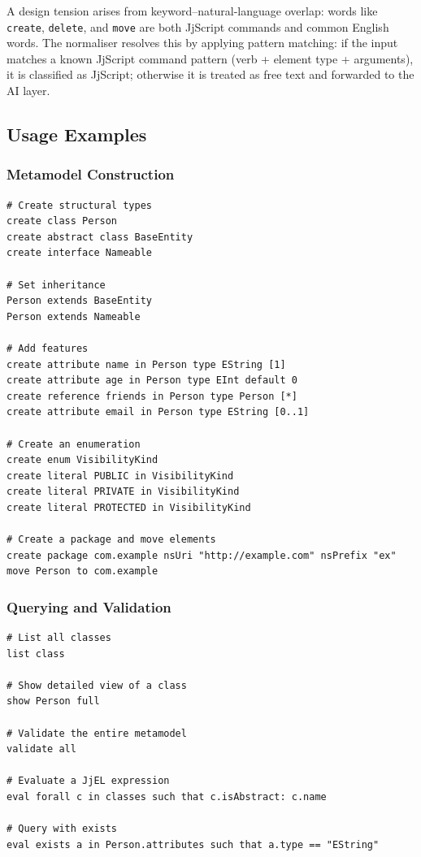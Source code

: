 \documentclass[11pt,a4paper]{article}
\newcommand{\jjscript}{\textsf{JjScript}}
\begin{document}
A design tension arises from keyword--natural-language overlap: words
like \texttt{create}, \texttt{delete}, and \texttt{move} are both
\jjscript{} commands and common English words. The normaliser resolves
this by applying pattern matching: if the input matches a known
\jjscript{} command pattern (verb + element type + arguments), it is
classified as \jjscript{}; otherwise it is treated as free text and
forwarded to the AI layer.


\subsection{Usage Examples}\label{sec:jjscript-examples}

\subsubsection{Metamodel Construction}

\begin{lstlisting}[style=jjscript,caption={Building a metamodel from scratch in JjScript}]
# Create structural types
create class Person
create abstract class BaseEntity
create interface Nameable

# Set inheritance
Person extends BaseEntity
Person extends Nameable

# Add features
create attribute name in Person type EString [1]
create attribute age in Person type EInt default 0
create reference friends in Person type Person [*]
create attribute email in Person type EString [0..1]

# Create an enumeration
create enum VisibilityKind
create literal PUBLIC in VisibilityKind
create literal PRIVATE in VisibilityKind
create literal PROTECTED in VisibilityKind

# Create a package and move elements
create package com.example nsUri "http://example.com" nsPrefix "ex"
move Person to com.example
\end{lstlisting}

\subsubsection{Querying and Validation}

\begin{lstlisting}[style=jjscript,caption={Inspection and validation in JjScript}]
# List all classes
list class

# Show detailed view of a class
show Person full

# Validate the entire metamodel
validate all

# Evaluate a JjEL expression
eval forall c in classes such that c.isAbstract: c.name

# Query with exists
eval exists a in Person.attributes such that a.type == "EString"
\end{lstlisting}
\end{document}
